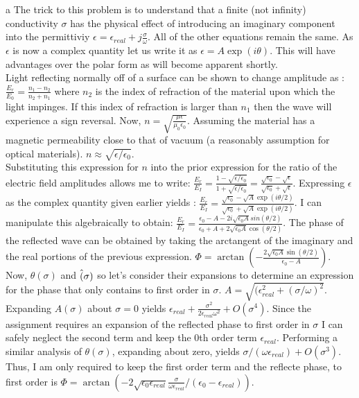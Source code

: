 \begin{homeworkProblem}
\begin{homeworkSection}{a}
The trick to this problem is to understand that a finite (not infinity) conductivity $\sigma$ has the physical effect of introducing an imaginary component into the permittiviy $\epsilon = \epsilon_{real} + j\frac{\sigma}{\omega}$. All of the other equations remain the same. As $\epsilon$ is now a complex quantity let us write it as $\epsilon = A\exp(i\theta)$. This will have advantages over the polar form as will become apparent shortly.
\\

Light reflecting normally off of a surface can be shown to change amplitude as : $\frac{E_r}{E_0} = \frac{n_1-n_2}{n_2+n_1}$ where $n_2$ is the index of refraction of the material upon which the light impinges. If this index of refraction is larger than $n_1$ then the wave will experience a sign reversal. Now, $n = \sqrt{\frac{\mu \epsilon}{\mu_0 \epsilon_0}}$. Assuming the material has a magnetic permeability close to that of vacuum (a reasonably assumption for optical materials). $n \approx \sqrt{\epsilon/\epsilon_0}$.
\\
Substituting this expression for $n$ into the prior expression for the ratio of the electric field amplitudes allows me to write: $\frac{E_r}{E_I} = \frac{1-\sqrt{\epsilon/\epsilon_0}}{1+\sqrt{\epsilon/\epsilon_0}} = \frac{\sqrt{\epsilon_0}-\sqrt{\epsilon}}{\sqrt{\epsilon_0}+\sqrt{\epsilon}}$. Expressing $\epsilon$ as the complex quantity given earlier yields : $\frac{E_r}{E_I} = \frac{\sqrt{\epsilon_0}-\sqrt{A}\exp(i\theta/2)}{\sqrt{\epsilon_0}+\sqrt{A}\exp(i\theta/2)}$. I can manipulate this algebraically to obtain: $\frac{E_r}{E_I} = \frac{\epsilon_0 - A - 2i\sqrt{\epsilon_0 A} sin(\theta/2)}{\epsilon_0 + A + 2\sqrt{\epsilon_0 A}\cos(\theta/2)}$. The phase of the reflected wave can be obtained by taking the arctangent of the imaginary and the real portions of the previous expression. $\Phi = \arctan(-\frac{2\sqrt{\epsilon_0 A}\sin(\theta/2)}{\epsilon_0-A})$. Now, $\theta(\sigma)$ and $\Hat{(}\sigma)$ so let's consider their expansions to determine an expression for the phase that only contains to first order in $\sigma$. $A = \sqrt{(\epsilon^2_{real}+(\sigma/\omega)^2}$. Expanding $A(\sigma)$ about $\sigma = 0 $ yields $\epsilon_{real} + \frac{\sigma^2}{2\epsilon_{real}\omega^2} + O(\sigma^4)$. Since the assignment requires an expansion of the reflected phase to first order in $\sigma$ I can safely neglect the second term and keep the 0th order term $\epsilon_{real}$. Performing a similar analysis of $\theta(\sigma)$, expanding about zero, yields $\sigma/(\omega \epsilon_{real}) + O(\sigma^3)$. Thus, I am only required to keep the first order term and the reflecte phase, to first order is $\Phi = \arctan(-2\sqrt{\epsilon_0 \epsilon_{real}}\frac{\sigma}{\omega \epsilon_{real}}/(\epsilon_0-\epsilon_{real}))$.

\end{homeworkSection}
\end{homeworkProblem}
